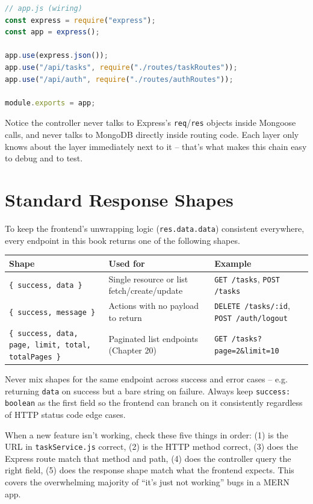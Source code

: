 \begin{lstlisting}[language=JavaScript]
// app.js (wiring)
const express = require("express");
const app = express();

app.use(express.json());
app.use("/api/tasks", require("./routes/taskRoutes"));
app.use("/api/auth", require("./routes/authRoutes"));

module.exports = app;
\end{lstlisting}

\begin{notebox}[NOTE]
Notice the controller never talks to Express's \texttt{req}/\texttt{res} objects
inside Mongoose calls, and never talks to MongoDB directly inside routing
code. Each layer only knows about the layer immediately next to it -- that's
what makes this chain easy to debug and to test.
\end{notebox}

\section{Standard Response Shapes}

To keep the frontend's unwrapping logic (\texttt{res.data.data}) consistent
everywhere, every endpoint in this book returns one of the following shapes.

\begin{table}[h]
\centering
\begin{tabularx}{\textwidth}{lXl}
\toprule
\textbf{Shape} & \textbf{Used for} & \textbf{Example} \\
\midrule
\texttt{\{ success, data \}} &
Single resource or list fetch/create/update &
\texttt{GET /tasks}, \texttt{POST /tasks} \\[4pt]
\texttt{\{ success, message \}} &
Actions with no payload to return &
\texttt{DELETE /tasks/:id}, \texttt{POST /auth/logout} \\[4pt]
\texttt{\{ success, data, page, limit, total, totalPages \}} &
Paginated list endpoints (Chapter 20) &
\texttt{GET /tasks?page=2\&limit=10} \\
\bottomrule
\end{tabularx}
\end{table}

\begin{warnbox}[WARNING]
Never mix shapes for the same endpoint across success and error cases --
e.g. returning \texttt{data} on success but a bare string on failure. Always
keep \texttt{success: boolean} as the first field so the frontend can branch on
it consistently regardless of HTTP status code edge cases.
\end{warnbox}

\begin{tipbox}[TIP]
When a new feature isn't working, check these five things in order: (1) is
the URL in \texttt{taskService.js} correct, (2) is the HTTP method correct, (3)
does the Express route match that method and path, (4) does the controller
query the right field, (5) does the response shape match what the frontend
expects. This covers the overwhelming majority of ``it's just not working''
bugs in a MERN app.
\end{tipbox}
